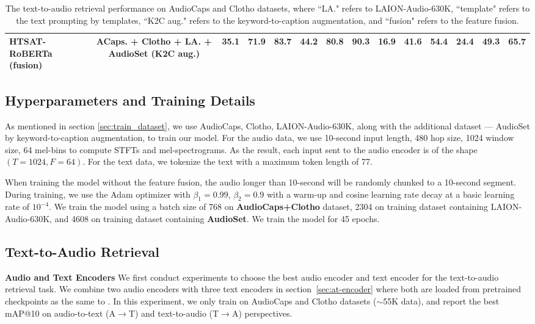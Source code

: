 \begin{table*}[t]
{\begin{tabular}{lccccccc|cccccc}
HTSAT-RoBERTa (fusion)    & ACaps. + Clotho + LA. + AudioSet (K2C aug.) &  35.1  & 71.9   &  83.7 &   44.2   &  80.8    & 90.3  &  16.9    &  41.6    & 54.4     & \textbf{24.4}    & 49.3    &  65.7 \\\hline\hline 
\end{tabular}}
\vspace{-0.2cm}
\caption{The text-to-audio retrieval performance on AudioCaps and Clotho datasets, where ``LA." refers to LAION-Audio-630K, ``template" refers to the text prompting by templates, ``K2C aug." refers to the keyword-to-caption augmentation, and ``fusion"  refers to the feature fusion.}
\vspace{-0.5cm}
\label{tab:exp-t2a-retrieval}
\end{table*}

\vspace{-0.2cm}
\subsection{Hyperparameters and Training Details}
As mentioned in section \ref{sec:train_dataset}, we use AudioCaps, Clotho, LAION-Audio-630K, along with the additional dataset --- AudioSet by keyword-to-caption augmentation, to train our model. For the audio data, we use 10-second input length, 480 hop size, 1024 window size, 64 mel-bins to compute STFTs and mel-spectrograms. As the result, each input sent to the audio encoder is of the shape $(T=1024, F=64)$. For the text data, we tokenize the text with a maximum token length of 77. 

When training the model without the feature fusion, the audio longer than 10-second will be randomly chunked to a 10-second segment. During training, we use the Adam \cite{kingma2014adam} optimizer with $\beta_1=0.99$, $\beta_2=0.9$ with a warm-up \cite{goyal2017accurate} and cosine learning rate decay at a basic learning rate of $10^{-4}$. We train the model using a batch size of 768 on \textbf{AudioCaps+Clotho} dataset, 2304 on training dataset containing LAION-Audio-630K, and 4608 on training dataset containing \textbf{AudioSet}. We train the model for 45 epochs.

\vspace{-0.2cm}
\subsection{Text-to-Audio Retrieval}

\noindent \textbf{Audio and Text Encoders} We first conduct experiments to choose the best audio encoder and text encoder for the text-to-audio retrieval task. We combine two audio encoders with three text encoders in section~\ref{sec:at-encoder} where both are loaded from pretrained checkpoints as the same to \cite{mmt,ml-act,clap-retrieval}. In this experiment, we only train on AudioCaps and Clotho datasets ($\sim$55K data), and report the best mAP@10 on audio-to-text (A$\rightarrow$T) and text-to-audio (T$\rightarrow$A) perspectives.

